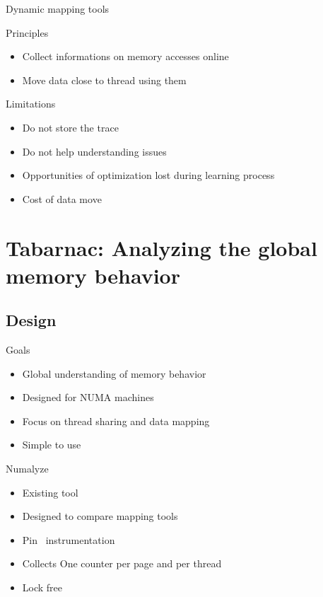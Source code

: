\documentclass[xcolor={usenames,dvipsnames},hyperref={pdfusetitle}]{beamer}
\begin{document}
\begin{frame}{Dynamic mapping tools~\cite{Corbet12Toward,Diener14kMAF}}
    \begin{block}{Principles}
        \begin{itemize}
            \item Collect informations on memory accesses online
            \item Move data close to thread using them
        \end{itemize}
    \end{block}
    \pause
    \begin{alertblock}{Limitations}
        \begin{itemize}
            \item Do not store the trace
            \item Do not help understanding issues
            \item Opportunities of optimization lost during learning process
            \item Cost of data move
        \end{itemize}
    \end{alertblock}
\end{frame}

\section{Tabarnac: Analyzing the global memory behavior}

\subsection{Design}

\begin{frame}{Goals}
    \begin{block}{}
        \begin{itemize}
            \item Global understanding of memory behavior
            \item Designed for NUMA machines
            \item Focus on thread sharing and data mapping
            \item Simple to use
        \end{itemize}
    \end{block}
\end{frame}

\begin{frame}{Numalyze~\cite{Diener15Characterizing}}
    \begin{block}{}
        \begin{itemize}
            \item Existing tool
            \item Designed to compare mapping tools
            \item Pin~\cite{Luk05Pin} instrumentation
            \item Collects One counter per page and per thread
            \item Lock free
        \end{itemize}
    \end{block}
\end{frame}
\end{document}
